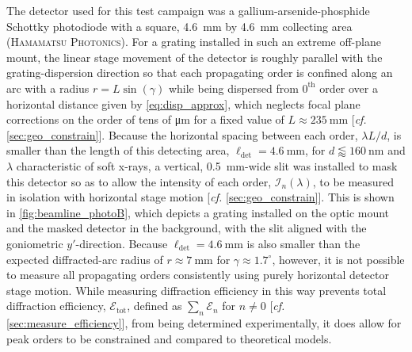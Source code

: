 The detector used for this test campaign was a gallium-arsenide-phosphide Schottky photodiode with a square, \SI{4.6}{\mm} by \SI{4.6}{\mm} collecting area (\textsc{Hamamatsu Photonics}). 
For a grating installed in such an extreme off-plane mount, the linear stage movement of the detector is roughly parallel with the grating-dispersion direction so that each propagating order is confined along an arc with a radius $r = L \sin \left( \gamma \right)$ while being dispersed from $0^{\text{th}}$ order over a horizontal distance given by \cref{eq:disp_approx}, which neglects focal plane corrections on the order of tens of \si{\um} for a fixed value of $L \approx \SI{235}{\mm}$ [\emph{cf.\@} \cref{sec:geo_constrain}]. 
Because the horizontal spacing between each order, $\lambda L / d$, is smaller than the length of this detecting area, $\ell_{\text{det}} = \SI{4.6}{\mm}$, for $d \lessapprox \SI{160}{\nm}$ and $\lambda$ characteristic of soft x-rays, a vertical, \SI{0.5}{\mm}-wide slit was installed to mask this detector so as to allow the intensity of each order, $\mathcal{I}_n \! \left( \lambda \right)$, to be measured in isolation with horizontal stage motion [\emph{cf.\@} \cref{sec:geo_constrain}].  
This is shown in \cref{fig:beamline_photoB}, which depicts a grating installed on the optic mount and the masked detector in the background, with the slit aligned with the goniometric $y'$-direction. 
Because $\ell_{\text{det}} = \SI{4.6}{\mm}$ is also smaller than the expected diffracted-arc radius of $r \approx \SI{7}{\mm}$ for $\gamma \approx 1.7^{\circ}$, however, it is not possible to measure all propagating orders consistently using purely horizontal detector stage motion. 
While measuring diffraction efficiency in this way prevents total diffraction efficiency, $\mathscr{E}_{\text{tot}}$, defined as $\sum_n \mathscr{E}_n$ for $n \neq 0$ [\emph{cf.\@} \cref{sec:measure_efficiency}], from being determined experimentally, it does allow for peak orders to be constrained and compared to theoretical models. 


